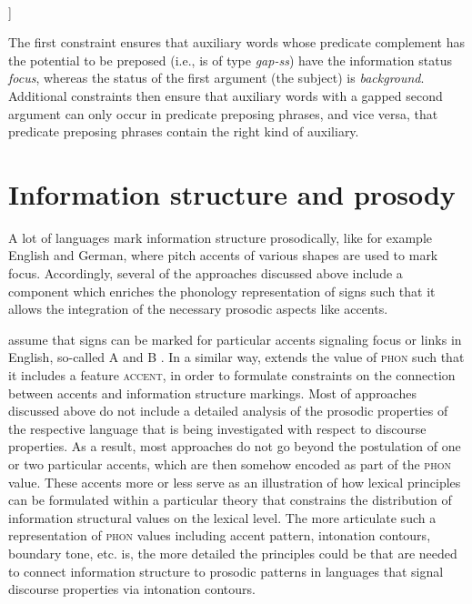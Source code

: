 \documentclass[output=paper
                ,modfonts
                ,nonflat
	        ,collection
	        ,collectionchapter
	        ,collectiontoclongg
 	        ,biblatex
                ,babelshorthands
                ,newtxmath
                ,draftmode
                ,colorlinks, citecolor=brown
]{./langsci/langscibook}
\begin{document}
\bigskip
{}
\impl\ 
\begin{avm}
  [\tp{hd-fill-ph}\\
    non-hd-dtr & [ss|status & bg]]
\end{avm}
  

  \label{fig:predicatepreposing}
\z
The first constraint ensures that auxiliary words whose predicate
complement has the potential to be preposed (i.e., is of type \textit{gap-ss}) have the
information status \textit{focus}, whereas the status of the first
argument (the subject) is \textit{background}. Additional constraints
then ensure that auxiliary words with a gapped second argument can
only occur in predicate preposing phrases, and vice versa, that
predicate preposing phrases contain the right kind of auxiliary.

\section{Information structure and prosody}
\label{sec:prosody}
A lot of languages mark information structure  prosodically, like for
example English and German, where pitch accents of various shapes are
used to mark focus. Accordingly, several of the approaches discussed above
include a component which enriches the phonology representation
of signs such that it allows the integration of the necessary prosodic
aspects like accents.

\cite{EV96a} assume that signs can be marked for particular accents
signaling focus or links in English, so-called A and B \isi{accents}.
In a similar way, \cite{deKuthy2002a} extends the value of
 \textsc{phon} such that it includes a feature
 \textsc{accent}, in order to formulate constraints on
the connection between accents and information structure markings.
Most of approaches discussed above do not include a detailed analysis
of the prosodic properties of the respective language that is being
investigated with respect to discourse properties. As a result, most
approaches do not go beyond the postulation of one or two particular
accents, which are then somehow encoded as part of the \textsc{phon}
value. These accents more or less serve as an illustration of how lexical
principles can be formulated within a particular theory that constrains
the distribution of information structural values on the lexical
level. The more articulate such a representation of \textsc{phon}
values including accent pattern, intonation contours, boundary tone,
etc. is, the more detailed the principles could be that are needed to
connect information structure to prosodic patterns in languages that
signal discourse properties via intonation contours.
\end{document}
